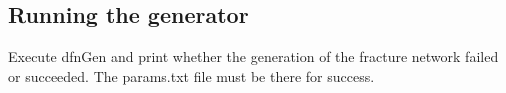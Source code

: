 \documentclass[letterpaper,10pt,english]{sphinxmanual}
\begin{document}
\subsection{Running the generator}
\label{\detokenize{pydfnworks:running-the-generator}}\label{\detokenize{pydfnworks:module-pydfnworks.generator}}

\begin{fulllineitems}
\label{\detokenize{pydfnworks:pydfnworks.generator.create_network}}
Execute dfnGen and print whether the generation of the fracture network failed or succeeded. The params.txt file must be there for success.

\end{fulllineitems}

\end{document}
